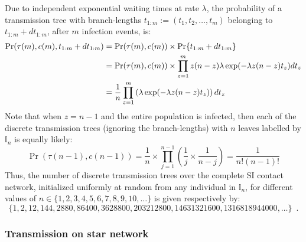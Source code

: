 \documentclass[review]{elsarticle}
\numberwithin{equation}{section}
\newcommand{\bI}{{\mathbb I}}
\begin{document}
Due to independent exponential waiting times at rate $\lambda$, the probability of a transmission tree with branch-lengths 
$t_{1:m} := (t_1,t_2,\ldots,t_m)$ belonging to $t_{1:m}+dt_{1:m}$, after $m$ infection events, is:
\begin{align}
\Pr(\tau(m),c(m),t_{1:m}+dt_{1:m}) 
&= \Pr(\tau(m),c(m)) \times \Pr\{ t_{1:m}+dt_{1:m} \} \notag \\
&= \Pr(\tau(m),c(m)) \times \prod_{z=1}^m {z(n-z)} \lambda \exp(-\lambda z (n-z) t_z) dt_z \notag \\
&= \frac{1}{n}\prod_{z=1}^m \left(\lambda \exp(-\lambda z (n-z) t_z) \right)dt_z
\end{align}
Note that when $z=n-1$ and the entire population is infected, then each of the discrete transmission trees (ignoring the branch-lengths) with $n$ leaves labelled by $\bI_n$ is equally likely:
\[
\Pr(\tau(n-1),c(n-1)) = \frac{1}{n} \times \prod_{j=1}^{n-1} \left( \frac{1}{j} \times \frac{1}{n-j}\right) = \frac{1}{n!(n-1)!}
\]
Thus, the number of discrete transmission trees over the complete SI contact network, initialized uniformly at random from any individual in $\bI_n$, for different values of $n \in \{1,2,3,4,5,6,7,8,9,10,\ldots\}$ is given respectively by:
\[
\{1,2,12,144,2880,86400,3628800,203212800, 14631321600, 1316818944000,\ldots\}\enspace .
\]

\subsubsection{Transmission on star network}\label{EX:TrStarNetwork}
\end{document}

